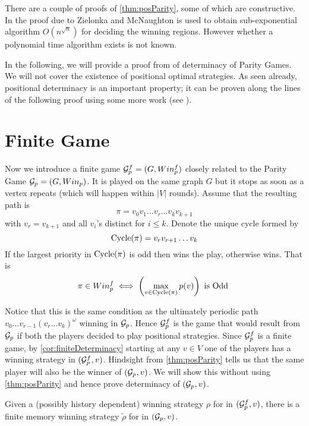 There are a couple of proofs of \autoref{thm:posParity}, some of which are constructive. In \cite{subexp} the proof due to Zielonka \cite{zielonka_infinite_1998} and McNaughton \cite{mcnaughton_infinite_1993} is used to obtain sub-exponential algorithm $O(n^{\sqrt{n}})$ for deciding the winning regions. However whether a polynomial time algorithm exists is not known.

In the following, we will provide a proof from \cite{bjorklund_memoryless_2004} of determinacy of Parity Games. We will not cover the existence of positional optimal strategies. As seen already, positional determinacy is an important property; it can be proven along the lines of the following proof using some more work (see \cite{bjorklund_memoryless_2004}).

\section{Finite Game}
\label{sec:parityFiniteGame}

Now we introduce a finite game $\mathcal{G}^f_p=(G,Win^f_p)$ closely related to the Parity Game $\mathcal{G}_p=(G,Win_p)$. It is played on the same graph $G$ but it stops as soon as a vertex repeats (which will happen within $|V|$ rounds). Assume that the resulting path is
\[
    \pi = v_0v_1 \ldots v_r \ldots v_k v_{k+1}
\]
with $v_r = v_{k+1}$ and all $v_i$'s distinct for $i \leq k$. Denote the unique cycle formed by
\begin{equation}
    \operatorname{Cycle}(\pi)=v_r v_{r+1} \ldots v_k \label{eq:cyclefinite}
\end{equation}
If the largest priority in $\operatorname{Cycle}(\pi)$ is odd then  wins the play, otherwise  wins. That is
\[
    \pi \in Win^f_p \iff \left(\max_{v \in \operatorname{Cycle}(\pi)} p(v)\right) \text{ is Odd }
\]

Notice that this is the same condition as the ultimately periodic path $v_0 \ldots v_{r-1} (v_r \ldots v_k)^\omega$ winning in $\mathcal{G}_p$. Hence $\mathcal{G}^f_p$ is the game that would result from $\mathcal{G}_p$ if both the players decided to play positional strategies. Since $\mathcal{G}^f_p$ is a finite game, by \autoref{cor:finiteDeterminacy} starting at any $v \in V$ one of the players has a winning strategy in $(\mathcal{G}^f_p, v)$. Hindsight from \autoref{thm:posParity} tells us that the same player will also be the winner of $(\mathcal{G}_p,v)$. We will show this without using \autoref{thm:posParity} and hence prove determinacy of $(\mathcal{G}_p,v)$.
\begin{theorem}
    \label{thm:parityDet}
    Given a (possibly history dependent) winning strategy $\rho$ for  in $(\mathcal{G}^f_p,v)$, there is a finite memory winning strategy $\tilde{\rho}$ for  in $(\mathcal{G}_p,v)$.
\end{theorem}

